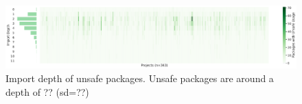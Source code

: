 \begin{figure}[!t]
    \centering
    \includegraphics[width=\textwidth]{assets/plots/chapter4/unsafe-import-depth.pdf}
    \caption{Import depth of unsafe packages. Unsafe packages are around a depth of ?? (sd=??)}
    \label{fig:unsafe-import-depth}
\end{figure}
